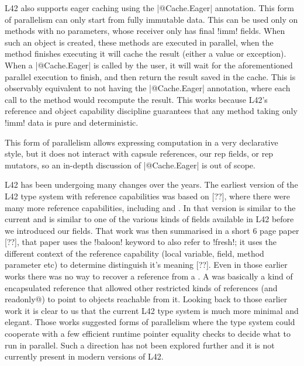 L42 also supports eager caching using the \Q|@Cache.Eager| annotation.
This form of parallelism can only start from fully immutable data.
This can be used only on methods with no parameters,
whose receiver only has final \Q!imm! fields.
When such an object is created, these methods are executed in parallel, when the method finishes executing it will cache the result (either a value or exception).
When a \Q|@Cache.Eager| is called by the user, it will wait for the aforementioned parallel execution to finish, and then return the result saved in the cache.
This is observably equivalent to not having the \Q|@Cache.Eager| annotation, where each call to the method would recompute the result.
This works because L42's reference and object capability discipline guarantees that any method taking only \Q!imm! data is pure and deterministic.

This form of parallelism allows expressing computation in a very declarative style, but it does not interact with capsule references, our rep fields, or rep mutators, so an in-depth discussion of \Q|@Cache.Eager| is out of scope.

L42 has been undergoing many changes over the years.
The earliest version of the L42 type system with reference capabilities was based on [??],
where there were many more reference capabilities, including
\Q@fresh@ and \Q@baloon@.
In that version \Q@fresh@ is similar to the current \Q@capsule@ and \Q@baloon@ is similar to one of the various kinds of \Q@capsule@ fields available in L42 before we introduced our \Q@rep@ fields.
That work was then summarised in a short 6 page paper [??], that
paper uses the \Q!baloon! keyword to also refer to \Q!fresh!; it uses the different context of the reference capability (local variable, field, method parameter etc) to determine distinguish it's meaning [??].
Even in those earlier works there was no way to recover a \Q@fresh@ reference from a \Q@baloon@. A \Q@baloon@ was basically a kind of encapsulated reference that allowed other restricted kinds of references (\Q@external@ and \Q@external readonly@) to point to objects reachable from it. Looking back to those earlier work it is clear to us that the current L42 type system is much more minimal and elegant.
Those works suggested forms of parallelism where the type system could cooperate with a few efficient runtime pointer equality checks to decide what to run in parallel.
Such a direction has not been explored further and it is not currently present in modern versions of L42.
